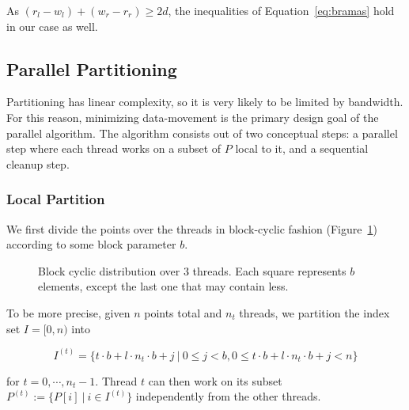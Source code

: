 As $(r_l - w_l) + (w_r - r_r) \geq 2d$, the inequalities of 
Equation~\ref{eq:bramas} hold in our case as well.

\subsection{Parallel Partitioning}

Partitioning has linear complexity, so it is very likely to be limited by
bandwidth. For this reason, minimizing data-movement is the primary design goal
of the parallel algorithm. The algorithm consists out of two conceptual steps:
a parallel step where each thread works on a subset of $P$ local to it, and 
a sequential cleanup step. 

\subsubsection{Local Partition}

We first divide the points over the threads in block-cyclic fashion 
(Figure~\ref{fig:blockcycl}) according to some block parameter $b$.

\begin{figure}[ht]
    \caption{Block cyclic distribution over $3$ threads. Each square represents
             $b$ elements, except the last one that may contain less.}
    \label{fig:blockcycl}
\end{figure}

To be more precise, given $n$ points total and $n_t$ threads, we partition
the index set $I = [0, n)$ into

$$I^{(t)} = \{t \cdot b + l \cdot n_t \cdot b + j \ | \ 0 \leq j < b,
                0 \leq t \cdot b + l \cdot n_t \cdot b + j < n\}$$

for $t = 0, \cdots, n_t - 1$. Thread $t$ can then work on its subset
$P^{(t)} := \{P[i] \ | \ i \in I^{(t)}\}$ independently from the other threads.

